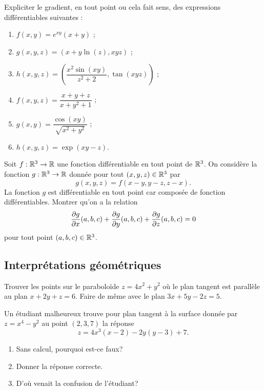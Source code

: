 \documentclass[11pt, a4paper]{article}
\begin{document}
\begin{question}
  Expliciter le gradient, en tout point ou cela fait sens, des
  expressions différentiables suivantes :
  \begin{enumerate}
  \item $f(x, y) = e^{xy}(x+y)$ ;
  \item $g(x, y, z) = (x + y\ln(z), xyz)$ ;
  \item $h(x, y, z) = \left(\dfrac{x^2\sin(xy)}{z^2 + 2}, \tan(xyz)\right)$ ;
  \item $f(x, y, z) = \dfrac{x + y + z}{x+y^2+1}$ ;
  \item $g(x, y) = \dfrac{\cos(xy)}{\sqrt{x^2 + y^2}}$ ;
  \item $h(x, y, z) = \exp(xy - z)$.
  \end{enumerate}
\end{question}

\begin{question}
  Soit $f : \mathbb{R}^3 \to \mathbb{R}$ une fonction différentiable en tout point de
  $\mathbb{R}^3$. On considère la fonction $g : \mathbb{R}^3 \to \mathbb{R}$ donnée pour tout
  $(x, y, z) \in \mathbb{R}^3$ par
  \[
  g(x, y, z) = f(x-y, y-z, z-x).
  \]
  La fonction $g$ est différentiable en tout point car composée de
  fonction différentiables. Montrer qu'on a la relation
  \[
  \frac{\partial g}{\partial x}(a,b, c) + \frac{\partial g}{\partial y}(a, b, c) + \frac{\partial
    g}{\partial z}(a, b, c) = 0
  \]
  pour tout point $(a, b, c) \in \mathbb{R}^3$.
\end{question}

\subsection{Interprétations géométriques}
\label{sec:interprétationsgeoms}

\begin{question}
  Trouver les points sur le paraboloïde $z = 4x^2 + y^2$ où le plan
  tangent est parallèle au plan $x + 2y + z = 6$. Faire de même avec le plan
  $3x + 5y -2z = 5$.
\end{question}

\begin{question}
  Un étudiant malheureux trouve pour plan tangent à la surface donnée
  par $z = x^4-y^2$ au point $(2, 3, 7)$ la réponse
  \[
  z = 4x^3(x-2) - 2y(y-3) + 7.
  \]
  \begin{enumerate}
  \item Sans calcul, pourquoi est-ce faux?
  \item Donner la réponse correcte.
  \item D'où venait la confusion de l'étudiant?
  \end{enumerate}
\end{question}
\end{document}
